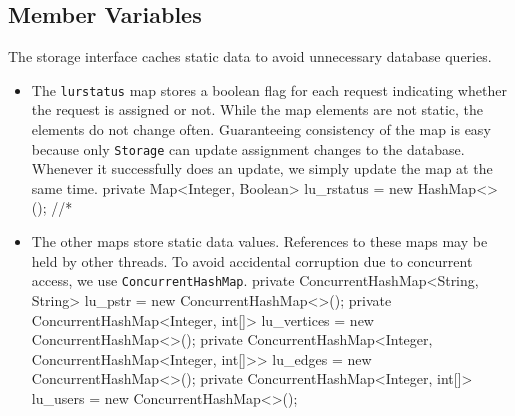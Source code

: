 \documentclass{article}
\def\nwendcode{\endtrivlist \endgroup}      %
\theoremstyle{definition}                   %
\begin{document}
\subsection{Member Variables}
\label{sec:member-variables}
The storage interface caches static data to avoid unnecessary database queries.
\begin{itemize}
\item The {\tt{}\protect{}\protect{}lu{}rstatus} map stores a boolean flag for each request indicating
whether the request is assigned or not. While the map elements are not static,
the elements do not change often. Guaranteeing consistency of the map is easy
because only {\tt{}Storage} can update assignment changes to the database.
Whenever it successfully does an update, we simply update the map at the same
time.
\nwenddocs{}\endmoddef{}
private Map<Integer, Boolean> lu_rstatus = new HashMap<>();  //*
\eatline
{}\nwendcode{}\item The other maps store static data values. References to these maps may be
held by other threads. To avoid accidental corruption due to concurrent access,
we use {\tt{}ConcurrentHashMap}.
\nwenddocs{}\plusendmoddef
private ConcurrentHashMap<String, String> lu_pstr     = new ConcurrentHashMap<>();
private ConcurrentHashMap<Integer, int[]> lu_vertices = new ConcurrentHashMap<>();
private ConcurrentHashMap<Integer,
    ConcurrentHashMap<Integer, int[]>>    lu_edges    = new ConcurrentHashMap<>();
private ConcurrentHashMap<Integer, int[]> lu_users    = new ConcurrentHashMap<>();
\eatline
{}\nwendcode{}\end{itemize}
\end{document}

